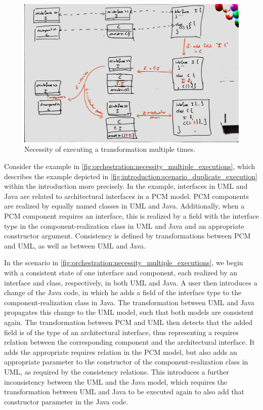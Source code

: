 \begin{figure}
    \centering
    \includegraphics[width=\textwidth]{figures/correctness/orchestration/necessity_multiple_executions.jpg}
    \caption[Necessity of executing a transformation multiple times]{Necessity of executing a transformation multiple times.}
    \label{fig:orchestration:necessity_multiple_executions}
\end{figure}

Consider the example in \autoref{fig:orchestration:necessity_multiple_executions}, which describes the example depicted in \autoref{fig:introduction:scenario_duplicate_execution} within the introduction more precisely.
In the example, interfaces in UML and Java are related to architectural interfaces in a \gls{PCM} model.
\gls{PCM} components are realized by equally named classes in UML and Java.
Additionally, when a \gls{PCM} component requires an interface, this is realized by a field with the interface type in the component-realization class in UML and Java and an appropriate constructor argument.
Consistency is defined by transformations between \gls{PCM} and UML, as well as between UML and Java.

In the scenario in \autoref{fig:orchestration:necessity_multiple_executions}, we begin with a consistent state of one interface and component, each realized by an interface and class, respectively, in both UML and Java.
A user then introduces a change of the Java code, in which he adds a field of the interface type to the component-realization class in Java.
The transformation between UML and Java propagates this change to the UML model, such that both models are consistent again.
The transformation between \gls{PCM} and UML then detects that the added field is of the type of an architectural interface, thus representing a requires relation between the corresponding component and the architectural interface. 
It adds the appropriate requires relation in the \gls{PCM} model, but also adds an appropriate parameter to the constructor of the component-realization class in UML, as required by the consistency relations.
This introduces a further inconsistency between the UML and the Java model, which requires the transformation between UML and Java to be executed again to also add that constructor parameter in the Java code.


